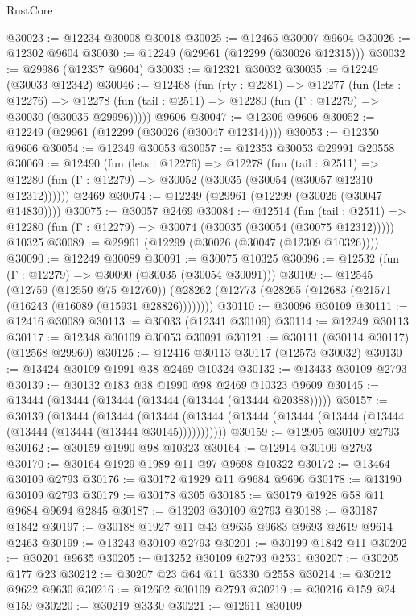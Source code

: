 \begin{lexlean}{RustCore}
\begin{coremodule}
@30023 := @12234 @30008 @30018
@30025 := @12465 @30007 @9604
@30026 := @12302 @9604
@30030 := @12249 (@29961 (@12299 (@30026 @12315)))
@30032 := @29986 (@12337 @9604)
@30033 := @12321 @30032
@30035 := @12249 (@30033 @12342)
@30046 := @12468
    (fun (rty : @2281) =>
    @12277
      (fun (lets : @12276) =>
      @12278 (fun (tail : @2511) => @12280 (fun (Γ : @12279) => @30030 (@30035 @29996)))))
    @9606
@30047 := @12306 @9606
@30052 := @12249 (@29961 (@12299 (@30026 (@30047 @12314))))
@30053 := @12350 @9606
@30054 := @12349 @30053
@30057 := @12353 @30053 @29991 @20558
@30069 := @12490
    (fun (lets : @12276) =>
    @12278
      (fun (tail : @2511) =>
      @12280 (fun (Γ : @12279) => @30052 (@30035 (@30054 (@30057 @12310 @12312))))))
    @2469
@30074 := @12249 (@29961 (@12299 (@30026 (@30047 @14830))))
@30075 := @30057 @2469
@30084 := @12514
    (fun (tail : @2511) => @12280 (fun (Γ : @12279) => @30074 (@30035 (@30054 (@30075 @12312)))))
    @10325
@30089 := @29961 (@12299 (@30026 (@30047 (@12309 @10326))))
@30090 := @12249 @30089
@30091 := @30075 @10325
@30096 := @12532 (fun (Γ : @12279) => @30090 (@30035 (@30054 @30091)))
@30109 := @12545
    (@12759 (@12550 @75 @12760))
    (@28262 (@12773 (@28265 (@12683 (@21571 (@16243 (@16089 (@15931 @28826))))))))
@30110 := @30096 @30109
@30111 := @12416 @30089
@30113 := @30033 (@12341 @30109)
@30114 := @12249 @30113
@30117 := @12348 @30109 @30053 @30091
@30121 := @30111 (@30114 @30117) (@12568 @29960)
@30125 := @12416 @30113 @30117 (@12573 @30032)
@30130 := @13424 @30109 @1991 @38 @2469 @10324
@30132 := @13433 @30109 @2793
@30139 := @30132 @183 @38 @1990 @98 @2469 @10323 @9609
@30145 := @13444 (@13444 (@13444 (@13444 (@13444 (@13444 @20388)))))
@30157 := @30139
    (@13444
      (@13444
        (@13444 (@13444 (@13444 (@13444 (@13444 (@13444 (@13444 (@13444 (@13444 @30145)))))))))))
@30159 := @12905 @30109 @2793
@30162 := @30159 @1990 @98 @10323
@30164 := @12914 @30109 @2793
@30170 := @30164 @1929 @1989 @11 @97 @9698 @10322
@30172 := @13464 @30109 @2793
@30176 := @30172 @1929 @11 @9684 @9696
@30178 := @13190 @30109 @2793
@30179 := @30178 @305
@30185 := @30179 @1928 @58 @11 @9684 @9694 @2845
@30187 := @13203 @30109 @2793
@30188 := @30187 @1842
@30197 := @30188 @1927 @11 @43 @9635 @9683 @9693 @2619 @9614 @2463
@30199 := @13243 @30109 @2793
@30201 := @30199 @1842 @11
@30202 := @30201 @9635
@30205 := @13252 @30109 @2793 @2531
@30207 := @30205 @177 @23
@30212 := @30207 @23 @64 @11 @3330 @2558
@30214 := @30212 @9622 @9630
@30216 := @12602 @30109 @2793
@30219 := @30216 @159 @24 @159
@30220 := @30219 @3330
@30221 := @12611 @30109

\end{coremodule}
\end{lexlean}
